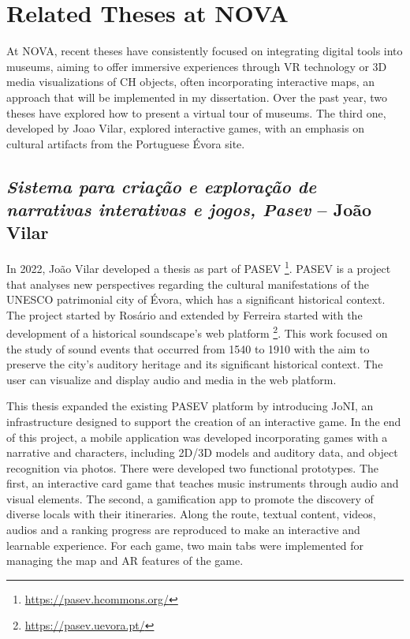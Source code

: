 \section{Related Theses at NOVA}
\label{sec:thesis_nova}


At NOVA, recent theses have consistently focused on integrating digital tools into museums, aiming to offer immersive experiences through \gls{VR} technology or \gls{3D} media visualizations 
of \gls{CH} objects, often incorporating interactive maps, an approach that will be implemented in my dissertation. Over the past year, two theses have explored how to 
present a virtual tour of museums. The third one, developed by Joao Vilar, explored interactive games, with an emphasis on cultural artifacts from the Portuguese Évora site.


\subsection{\textit{Sistema para criação e exploração de narrativas interativas e jogos, Pasev} – João Vilar}
\label{sec:thesis1_nova}


In 2022, João Vilar developed a thesis as part of \gls{PASEV} \footnote{\url{https://pasev.hcommons.org/}}. \gls{PASEV} is a project that analyses new perspectives regarding the cultural manifestations of the UNESCO patrimonial city of Évora,
which has a significant historical context. The project started by Rosário and extended by Ferreira started with the development of a historical soundscape's web platform \footnote{\url{https://pasev.uevora.pt/}}. 
This work focused on the study of sound events that occurred from 1540 to 1910 with the aim to preserve the city's auditory heritage and its significant historical context. The user can
visualize and display audio and media in the web platform. ~\cite{rodrigues2021using}

  
This thesis expanded the existing \gls{PASEV} platform by introducing JoNI, an infrastructure designed to support the creation of an interactive game. In the end of this project, a mobile 
application was developed incorporating games with a narrative and characters, including \gls{2D}/\gls{3D} models and auditory data, and object recognition via photos. There were developed two 
functional prototypes. The first, an interactive card game that teaches music instruments through audio and visual elements. The second, a gamification app to promote the discovery 
of diverse locals with their itineraries.  Along the route, textual content, videos, audios and a ranking progress are reproduced to make an interactive and learnable experience. 
For each game, two main tabs were implemented for managing the map and \gls{AR} features of the game. ~\cite{tese_jogosVilar2022}

